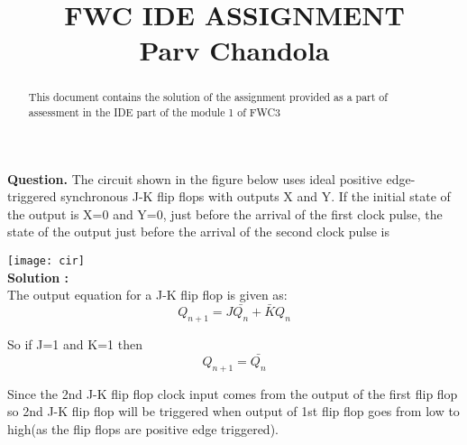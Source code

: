 \documentclass[journal,12pt,twocolumn]{IEEEtran}
\begin{document}
\let\StandardTheFigure\thefigure
\let\vec\mathbf
\renewcommand{\thefigure}{\theproblem}



\def\putbox#1#2#3{\makebox[0in][l]{\makebox[#1][l]{}\raisebox{\baselineskip}[0in][0in]{\raisebox{#2}[0in][0in]{#3}}}}
     \def\rightbox#1{\makebox[0in][r]{#1}}
     \def\centbox#1{\makebox[0in]{#1}}
     \def\topbox#1{\raisebox{-\baselineskip}[0in][0in]{#1}}
     \def\midbox#1{\raisebox{-0.5\baselineskip}[0in][0in]{#1}}

\title{FWC IDE ASSIGNMENT\\ \normalsize Parv Chandola}
\maketitle
\begin{abstract}
This document contains the solution of the assignment provided as a part of assessment in the IDE part of the module 1 of FWC3 
\end{abstract}

\vspace{3mm}

\textbf{Question.} The circuit shown in the figure below uses ideal positive edge-triggered synchronous J-K flip flops with outputs X and Y. If the initial state of the output is X=0 and Y=0, just before the arrival of the first clock pulse, the state of the output just before the arrival of the second clock pulse is\\

\graphicspath{ {/home/annu/Downloads/nursery/} }
\texttt{[image: cir]}
\\

\textbf{Solution : }\\

The output equation for a J-K flip flop is given as:
$$Q_{n+1} = J\bar{Q_{n}} + \bar{K}Q_{n}$$

So if J=1 and K=1 then
$$Q_{n+1} = \bar{Q_{n}}$$

Since the 2nd J-K flip flop clock input comes from the output of the first flip flop so 2nd J-K flip flop will be triggered when output of 1st flip flop goes from low to high(as the flip flops are positive edge triggered).\\
\end{document}
